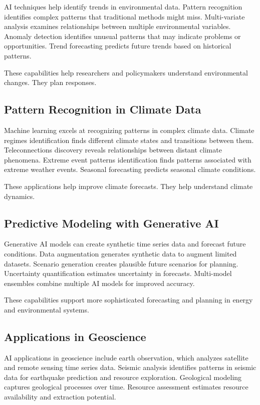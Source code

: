 AI techniques help identify trends in environmental data. Pattern recognition identifies complex patterns that traditional methods might miss. Multi-variate analysis examines relationships between multiple environmental variables. Anomaly detection identifies unusual patterns that may indicate problems or opportunities. Trend forecasting predicts future trends based on historical patterns.

These capabilities help researchers and policymakers understand environmental changes. They plan responses.

\subsection{Pattern Recognition in Climate Data}

Machine learning excels at recognizing patterns in complex climate data. Climate regimes identification finds different climate states and transitions between them. Teleconnections discovery reveals relationships between distant climate phenomena. Extreme event patterns identification finds patterns associated with extreme weather events. Seasonal forecasting predicts seasonal climate conditions.

These applications help improve climate forecasts. They help understand climate dynamics.

\subsection{Predictive Modeling with Generative AI}

Generative AI models can create synthetic time series data and forecast future conditions. Data augmentation generates synthetic data to augment limited datasets. Scenario generation creates plausible future scenarios for planning. Uncertainty quantification estimates uncertainty in forecasts. Multi-model ensembles combine multiple AI models for improved accuracy.

These capabilities support more sophisticated forecasting and planning in energy and environmental systems.

\subsection{Applications in Geoscience}

AI applications in geoscience include earth observation, which analyzes satellite and remote sensing time series data. Seismic analysis identifies patterns in seismic data for earthquake prediction and resource exploration. Geological modeling captures geological processes over time. Resource assessment estimates resource availability and extraction potential.

